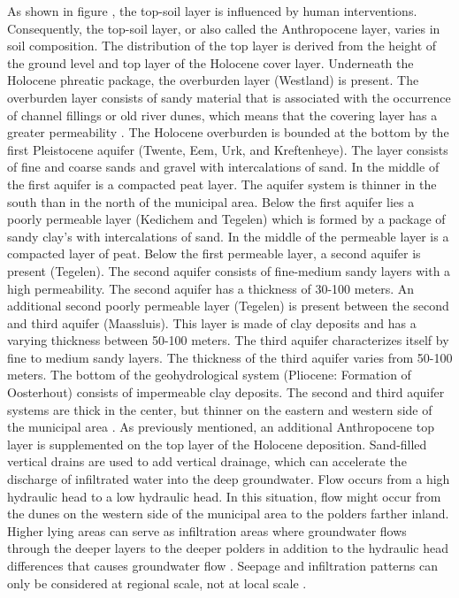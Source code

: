 As shown in figure , the top-soil layer is influenced by human interventions. Consequently, the top-soil layer, or also called the Anthropocene layer, varies in soil composition. The distribution of the top layer is derived from the height of the ground level and top layer of the Holocene cover layer. Underneath the Holocene phreatic package, the overburden layer (Westland) is present. The overburden layer consists of sandy material that is associated with the occurrence of channel fillings or old river dunes, which means that the covering layer has a greater permeability \cite{janssen-2005}. The Holocene overburden is bounded at the bottom by the first Pleistocene aquifer (Twente, Eem, Urk, and Kreftenheye). The layer consists of fine and coarse sands and gravel with intercalations of sand. In the middle of the first aquifer is a compacted peat layer. The aquifer system is thinner in the south than in the north of the municipal area. Below the first aquifer lies a poorly permeable layer (Kedichem and Tegelen) which is formed by a package of sandy clay's with intercalations of sand. In the middle of the permeable layer is a compacted layer of peat. Below the first permeable layer, a second aquifer is present (Tegelen). The second aquifer consists of fine-medium sandy layers with a high permeability. The second aquifer has a thickness of 30-100 meters. An additional second poorly permeable layer (Tegelen) is present between the second and third aquifer (Maassluis). This layer is made of clay deposits and has a varying thickness between 50-100 meters. The third aquifer characterizes itself by fine to medium sandy layers. The thickness of the third aquifer varies from 50-100 meters. The bottom of the geohydrological system (Pliocene: Formation of Oosterhout) consists of impermeable clay deposits. The second and third aquifer systems are thick in the center, but thinner on the eastern and western side of the municipal area \cite{janssen-2005}. As previously mentioned, an additional Anthropocene top layer is supplemented on the top layer of the Holocene deposition. Sand-filled vertical drains are used to add vertical drainage, which can accelerate the discharge of infiltrated water into the deep groundwater. Flow occurs from a high hydraulic head to a low hydraulic head. In this situation, flow might occur from the dunes on the western side of the municipal area to the polders farther inland. Higher lying areas can serve as infiltration areas where groundwater flows through the deeper layers to the deeper polders in addition to the hydraulic head differences that causes groundwater flow \cite{valstar-2019}. Seepage and infiltration patterns can only be considered at regional scale, not at local scale \cite{koomen-2011}. \\
